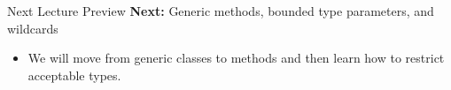 \documentclass{beamer}
\begin{document}
\begin{frame}{Next Lecture Preview}
  \textbf{Next:} Generic methods, bounded type parameters, and wildcards
  \vspace{0.6em}
  \begin{itemize}[<+->]
    \item We will move from generic classes to methods and then learn how to restrict acceptable types.
  \end{itemize}
  \slidesources{\OOPSUnitIVSources}
\end{frame}
\end{document}
